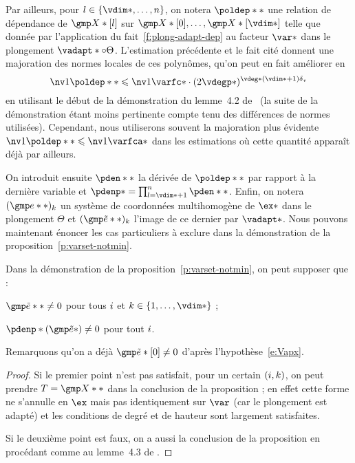Par ailleurs, pour \( \indi \in \set{\vdim*, \dots, \dimp} \), on notera \(
  \poldep** \) une relation de dépendance de \( \vmp*[\indi] \) sur \(
  \vmp*[0], \dots, \vmp*[\vdim*] \) telle que donnée par l'application du
fait~\ref{f:plong-adapt-dep} au facteur \( \var* \) dans le plongement \(
  \vadapt* \circ \Theta \). L'estimation précédente et le fait cité donnent
une majoration des normes locales de ces polynômes, qu'on peut en fait
améliorer en
\begin{equation} \label{e:nv-poldep}
  \nv1{\poldep**} \le \nv1{\varfc*}
  \cdot ( 2 \vdegp* )^{\vdeg* (\vdim* + 1) \dv}
\end{equation}
en utilisant le début de la démonstration du lemme~4.2 de~\cite{remivds} (la
suite de la démonstration étant moins pertinente compte tenu des différences
de normes utilisées). Cependant, nous utiliserons souvent la majoration plus
évidente \( \nv1{\poldep**} \le \nv1{\varfca*} \) dans les estimations où
cette quantité apparaît déjà par ailleurs.

On introduit ensuite \( \pden** \) la dérivée de \( \poldep** \) par rapport à
la dernière variable et \( \pdenp* = \prod_{\indi=\vdim*+1}^\dimp \pden** \).
Enfin, on notera \( (\cex**)_\ind \) un système de coordonnées
multihomogène de \( \ex* \) dans le plongement \( \Theta \) et \(
  (\cexa**)_\ind \) l'image de ce dernier par \( \vadapt* \).  Nous pouvons
maintenant énoncer les cas particuliers à exclure dans la démonstration de la
proposition~\ref{p:varset-notmin}.

\begin{scho} \label{s:part-cases}
  Dans la démonstration de la proposition~\ref{p:varset-notmin}, on peut
  supposer que :
  \begin{enumthm}
    \item \( \cexa** \neq 0 \) pour tous \( i \) et \( \ind \in \set{1,
          \dots, \vdim*} \) ;
    \item \( \pdenp*(\cexa*) \neq 0 \) pour tout \( i \).
  \end{enumthm}
  Remarquons qu'on a déjà \( \cexa*[0] \neq 0 \) d'après
  l'hypothèse~\eqref{e:Vapx}.
\end{scho}

\begin{proof}
  Si le premier point n'est pas satisfait, pour un certain \( (i, k) \),
  on peut prendre \( T = \vmp** \) dans la conclusion de la
  proposition ; en effet cette forme ne s'annulle en \( \ex \) mais pas
  identiquement sur \( \var \) (car le plongement est adapté) et les
  conditions de degré et de hauteur sont largement satisfaites.

  \later
  Si le deuxième point est faux, on a aussi la conclusion de la proposition en
  procédant comme au lemme~4.3 de \cite{remivds}.
\end{proof}

